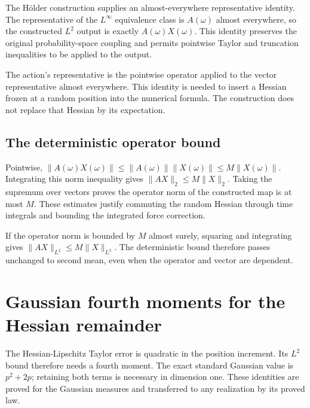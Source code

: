 \documentclass[11pt,a4paper]{report}
\begin{document}
The Hölder construction supplies an almost-everywhere representative identity. The representative of the \(L^\infty\) equivalence class is \(A(\omega )\) almost everywhere, so the constructed \(L^{2}\) output is exactly \(A(\omega )X(\omega )\). This identity preserves the original probability-space coupling and permits pointwise Taylor and truncation inequalities to be applied to the output.



The action’s representative is the pointwise operator applied to the vector representative almost everywhere. This identity is needed to insert a Hessian frozen at a random position into the numerical formula. The construction does not replace that Hessian by its expectation.

\subsection{\texorpdfstring{The deterministic operator bound}{The deterministic operator bound}}
\label{report-step-KineticLangevin-RandomOperatorLp-lean-3}


Pointwise, \(\|A(\omega )X(\omega )\|\le \|A(\omega )\|\|X(\omega )\|\le M\|X(\omega )\|\). Integrating this norm inequality gives \(\|AX\|_{2}\le M\|X\|_{2}\). Taking the supremum over vectors proves the operator norm of the constructed map is at most \(M\). These estimates justify commuting the random Hessian through time integrals and bounding the integrated force correction.



If the operator norm is bounded by \(M\) almost surely, squaring and integrating gives \(\|AX\|_{L^2}\le M\|X\|_{L^2}\). The deterministic bound therefore passes unchanged to second mean, even when the operator and vector are dependent.

\section{\texorpdfstring{Gaussian fourth moments for the Hessian remainder}{Gaussian fourth moments for the Hessian remainder}}
\label{proof-module-KineticLangevin-GaussianFourth-lean}


The Hessian-Lipschitz Taylor error is quadratic in the position increment. Its \(L^{2}\) bound therefore needs a fourth moment. The exact standard Gaussian value is \(p^2+2p\); retaining both terms is necessary in dimension one. These identities are proved for the Gaussian measures and transferred to any realization by its proved law.
\end{document}
